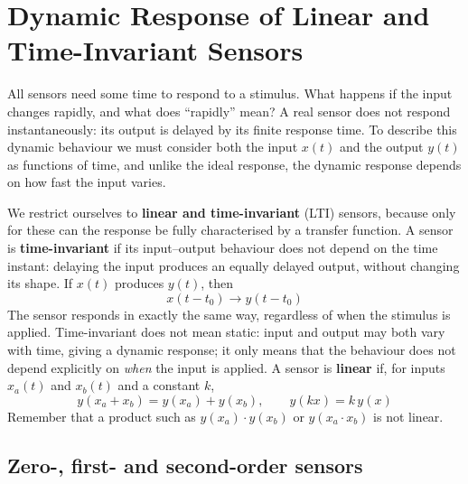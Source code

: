\documentclass[letterpaper,11pt,leqno]{book}
\begin{document}
\section{Dynamic Response of Linear and Time-Invariant Sensors}
\label{sec:lti}

All sensors need some time to respond to a stimulus. What happens if the input changes rapidly, and what does ``rapidly'' mean? A real sensor does not respond instantaneously: its output is delayed by its finite response time. To describe this dynamic behaviour we must consider both the input $x(t)$ and the output $y(t)$ as functions of time, and unlike the ideal response, the dynamic response depends on how fast the input varies.

We restrict ourselves to \textbf{linear and time-invariant} (LTI) sensors, because only for these can the response be fully characterised by a transfer function. A sensor is \textbf{time-invariant} if its input--output behaviour does not depend on the time instant: delaying the input produces an equally delayed output, without changing its shape. If $x(t)$ produces $y(t)$, then
\begin{equation}
\boxed{x(t - t_0) \longrightarrow y(t - t_0)}
\label{eq:lti_time_invariance}
\end{equation}
The sensor responds in exactly the same way, regardless of when the stimulus is applied. Time-invariant does not mean static: input and output may both vary with time, giving a dynamic response; it only means that the behaviour does not depend explicitly on \emph{when} the input is applied. A sensor is \textbf{linear} if, for inputs $x_a(t)$ and $x_b(t)$ and a constant $k$,
\begin{equation}
\boxed{y(x_a + x_b) = y(x_a) + y(x_b), \qquad y(kx) = k\,y(x)}
\label{eq:lti_linearity}
\end{equation}
Remember that a product such as $y(x_a)\cdot y(x_b)$ or $y(x_a \cdot x_b)$ is not linear.

\subsection{Zero-, first- and second-order sensors}
\end{document}
